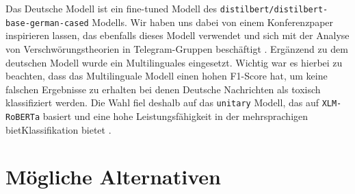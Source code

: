 \documentclass[12pt]{report}
\begin{document}
Das Deutsche Modell ist ein fine-tuned Modell des \texttt{distilbert/distilbert-base-german-cased} Modells. Wir haben uns dabei von einem Konferenzpaper inspirieren lassen, das ebenfalls dieses Modell verwendet und sich mit der Analyse von Verschwörungstheorien in Telegram-Gruppen beschäftigt \cite{weigand-etal-2022-conspiracy}.
\newline\newline
Ergänzend zu dem deutschen Modell wurde ein Multilinguales eingesetzt. Wichtig war es hierbei zu beachten, dass das Multilinguale Modell einen hohen F1-Score hat, um keine falschen Ergebnisse zu erhalten bei denen Deutsche Nachrichten als toxisch klassifiziert werden. Die Wahl fiel deshalb auf das \texttt{unitary} Modell, das auf \texttt{XLM-RoBERTa} basiert und eine hohe Leistungsfähigkeit in der mehrsprachigen bietKlassifikation bietet \cite{model-comparison}.



\section{Mögliche Alternativen}



\newpage
{}
\setcounter{page}{\value{frontmatterPage}} %
\addtocounter{page}{1}

\renewcommand{\refname}{Literaturverzeichnis}


\end{document}

